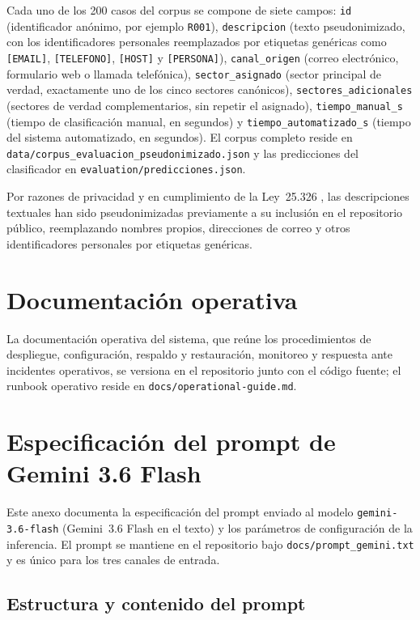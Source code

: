Cada uno de los 200 casos del corpus se compone de siete campos: \texttt{id} (identificador anónimo, por ejemplo \texttt{R001}), \texttt{descripcion} (texto pseudonimizado, con los identificadores personales reemplazados por etiquetas genéricas como \texttt{[EMAIL]}, \texttt{[TELEFONO]}, \texttt{[HOST]} y \texttt{[PERSONA]}), \texttt{canal\_origen} (correo electrónico, formulario web o llamada telefónica), \texttt{sector\_asignado} (sector principal de verdad, exactamente uno de los cinco sectores canónicos), \texttt{sectores\_adicionales} (sectores de verdad complementarios, sin repetir el asignado), \texttt{tiempo\_manual\_s} (tiempo de clasificación manual, en segundos) y \texttt{tiempo\_automatizado\_s} (tiempo del sistema automatizado, en segundos). El corpus completo reside en \texttt{data/corpus\_evaluacion\_pseudonimizado.json} y las predicciones del clasificador en \texttt{evaluation/predicciones.json}.

Por razones de privacidad y en cumplimiento de la Ley~25.326 \parencite{Ley25326_2000}, las descripciones textuales han sido pseudonimizadas previamente a su inclusión en el repositorio público, reemplazando nombres propios, direcciones de correo y otros identificadores personales por etiquetas genéricas.

\section{Documentación operativa}\label{sec:anexo-documentacion-operativa}

La documentación operativa del sistema, que reúne los procedimientos de despliegue, configuración, respaldo y restauración, monitoreo y respuesta ante incidentes operativos, se versiona en el repositorio junto con el código fuente; el runbook operativo reside en \texttt{docs/operational-guide.md}.

\section{Especificación del prompt de Gemini 3.6 Flash}
\label{anexo:H}

Este anexo documenta la especificación del prompt enviado al modelo \texttt{gemini-3.6-flash} (Gemini~3.6 Flash en el texto) y los parámetros de configuración de la inferencia. El prompt se mantiene en el repositorio bajo \texttt{docs/prompt\_gemini.txt} y es único para los tres canales de entrada.

\subsection{Estructura y contenido del prompt}\label{subsec:anexo-estructura-prompt}

